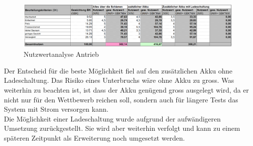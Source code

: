 \documentclass[../../main.tex]{subfiles}
\begin{document}
    \begin{figure}[H]
        \centering
        \includegraphics[width=1.0\textwidth]{Strom_Nutzwertanalyse.png}
        \caption {Nutzwertanalyse Antrieb}
        \label{fig:strom_nutzwertanalyse}
    \end{figure}

    Der Entscheid für die beste Möglichkeit fiel auf den zusätzlichen Akku ohne Ladeschaltung. Das Risiko eines Unterbruchs wäre ohne Akku zu gross. Was weiterhin zu beachten ist, ist dass der Akku genügend gross ausgelegt wird, da er nicht nur für den Wettbewerb reichen soll, sondern auch für längere Tests das System mit Strom versorgen kann.\\ 
    Die Möglichkeit einer Ladeschaltung wurde aufgrund der aufwändigeren Umsetzung zurückgestellt. Sie wird aber weiterhin verfolgt und kann zu einem späteren Zeitpunkt als Erweiterung noch umgesetzt werden.
    


    
\end{document}
